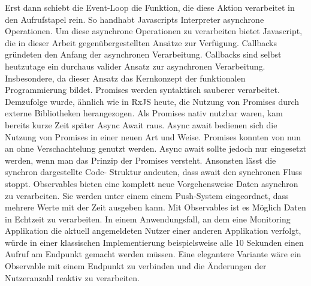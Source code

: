 \noindent
Erst dann schiebt die Event-Loop die Funktion, die diese Aktion verarbeitet in den Aufrufstapel rein. So handhabt Javascripts Interpreter asynchrone Operationen. Um diese asynchrone Operationen zu verarbeiten bietet Javascript, die in dieser Arbeit gegenübergestellten Ansätze zur Verfügung. Callbacks gründeten den Anfang der asynchronen Verarbeitung. Callbacks sind selbst heutzutage ein durchaus valider Ansatz zur asynchronen Verarbeitung. Insbesondere, da dieser Ansatz das Kernkonzept der funktionalen Programmierung bildet. Promises werden syntaktisch \glqq sauberer\grqq{} verarbeitet. Demzufolge wurde, ähnlich wie in RxJS heute, die Nutzung von Promises durch externe Bibliotheken herangezogen. Als Promises nativ nutzbar waren, kam bereits kurze Zeit später Async Await raus. Async await bedienen sich die Nutzung von Promises in einer neuen Art und Weise. Promises konnten von nun an ohne Verschachtelung genutzt werden. Async await sollte jedoch nur eingesetzt werden, wenn man das Prinzip der Promises versteht. Ansonsten lässt die synchron dargestellte Code- Struktur andeuten, dass await den synchronen Fluss stoppt. Observables bieten eine komplett neue Vorgehensweise Daten asynchron zu verarbeiten. Sie werden unter einem einem Push-System eingeordnet, dass mehrere Werte mit der Zeit ausgeben kann. Mit Observables ist es Möglich Daten in Echtzeit zu verarbeiten. In einem Anwendungsfall, an dem eine Monitoring Applikation die aktuell angemeldeten Nutzer einer anderen Applikation verfolgt, würde in einer klassischen Implementierung beispielsweise alle 10 Sekunden einen Aufruf am Endpunkt gemacht werden müssen. Eine elegantere Variante wäre ein Observable mit einem Endpunkt zu verbinden und die Änderungen der Nutzeranzahl reaktiv zu verarbeiten.
